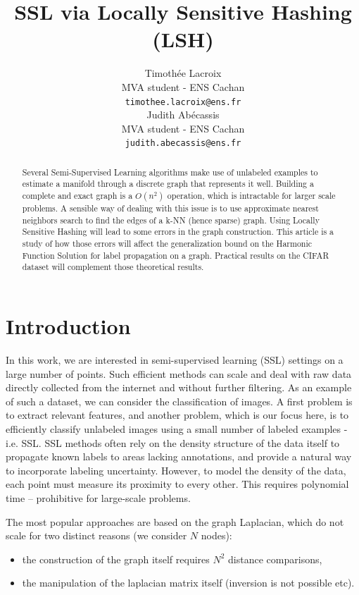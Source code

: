 \documentclass{article} %
\title{SSL via Locally Sensitive Hashing (LSH)}
\author{
Timothée Lacroix \\
MVA student - ENS Cachan\\
\texttt{timothee.lacroix@ens.fr} \\
\And
Judith Abécassis \\
MVA student - ENS Cachan \\
\texttt{judith.abecassis@ens.fr} \\
}
\begin{document}
\maketitle

\begin{abstract}
Several Semi-Supervised Learning algorithms make use of unlabeled examples to estimate a manifold through a discrete graph that represents it well. Building a complete and exact graph is a $O(n^2)$ operation, which is intractable for larger scale problems. A sensible way of dealing with this issue is to use approximate nearest neighbors search to find the edges of a k-NN (hence sparse) graph. Using Locally Sensitive Hashing will lead to some errors in the graph construction. This article is a study of how those errors will affect the generalization bound on the Harmonic Function Solution for label propagation on a graph. Practical results on the CIFAR dataset will complement those theoretical results.
\end{abstract}


\section{Introduction}
In this work, we are interested in semi-supervised learning (SSL) settings on a large number of points. Such efficient methods can scale and deal with raw data directly collected from the internet and without further filtering. As an example of such a dataset, we can consider the classification of images. A first problem is to extract relevant features, and another problem, which is our focus here, is to efficiently classify unlabeled images using a small number of labeled examples - i.e. SSL. SSL methods often rely on the density structure of the data itself to propagate known labels to areas lacking annotations, and provide a natural way to incorporate labeling uncertainty. However, to model the density of the data, each point must measure its proximity to every other. This requires polynomial time – prohibitive for large-scale problems. 

 The most popular approaches are based on the graph Laplacian, which do not scale for two distinct reasons (we consider $N$ nodes):
\begin{itemize}
\item the construction of the graph itself requires $N^2$ distance comparisons,
\item the manipulation of the laplacian matrix itself (inversion is not possible etc).
\end{itemize}
\end{document}
